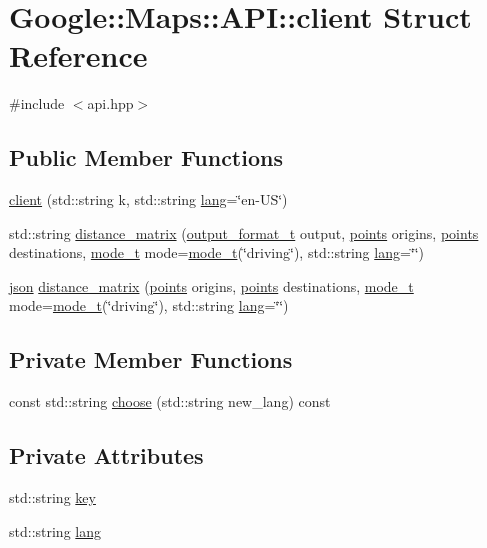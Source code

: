 \hypertarget{a00047}{}\section{Google\+:\+:Maps\+:\+:A\+PI\+:\+:client Struct Reference}
\label{a00047}


{\ttfamily \#include $<$api.\+hpp$>$}

\subsection*{Public Member Functions}
\begin{DoxyCompactItemize}
\item 
\hyperlink{a00047_aa4e453192444e3ed3ae486036e852f03}{client} (std\+::string k, std\+::string \hyperlink{a00047_a4854d3b172e3e823b647897fe8b24f44}{lang}=\char`\"{}en-\/US\char`\"{})
\item 
std\+::string \hyperlink{a00047_ac6a0c1904a585c4eb930c17e3dcf2ce9}{distance\+\_\+matrix} (\hyperlink{a00055}{output\+\_\+format\+\_\+t} output, \hyperlink{a00063}{points} origins, \hyperlink{a00063}{points} destinations, \hyperlink{a00051}{mode\+\_\+t} mode=\hyperlink{a00051}{mode\+\_\+t}(\char`\"{}driving\char`\"{}), std\+::string \hyperlink{a00047_a4854d3b172e3e823b647897fe8b24f44}{lang}=\char`\"{}\char`\"{})
\item 
\hyperlink{a00011_ab701e3ac61a85b337ec5c1abaad6742d}{json} \hyperlink{a00047_a8682b0c7b0597c2f7f0585c314459418}{distance\+\_\+matrix} (\hyperlink{a00063}{points} origins, \hyperlink{a00063}{points} destinations, \hyperlink{a00051}{mode\+\_\+t} mode=\hyperlink{a00051}{mode\+\_\+t}(\char`\"{}driving\char`\"{}), std\+::string \hyperlink{a00047_a4854d3b172e3e823b647897fe8b24f44}{lang}=\char`\"{}\char`\"{})
\end{DoxyCompactItemize}
\subsection*{Private Member Functions}
\begin{DoxyCompactItemize}
\item 
const std\+::string \hyperlink{a00047_ab9af6c85cf06cff7e2e877c7ed1db179}{choose} (std\+::string new\+\_\+lang) const
\end{DoxyCompactItemize}
\subsection*{Private Attributes}
\begin{DoxyCompactItemize}
\item 
std\+::string \hyperlink{a00047_a81829bbeb30b8931e2929a3d9815045b}{key}
\item 
std\+::string \hyperlink{a00047_a4854d3b172e3e823b647897fe8b24f44}{lang}
\end{DoxyCompactItemize}



